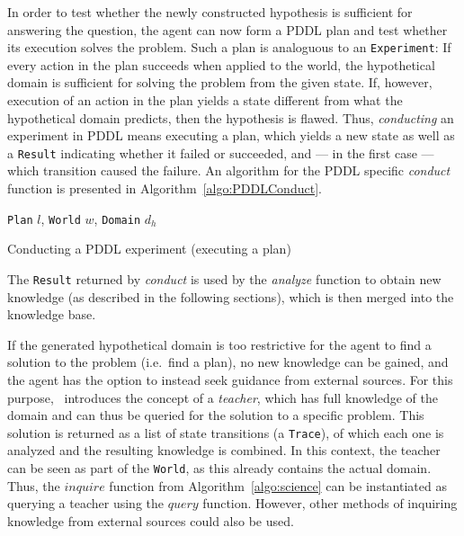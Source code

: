\documentclass[../Master.tex]{subfiles}
\begin{document}
In order to test whether the newly constructed hypothesis is sufficient for answering the question, the agent can now form a PDDL plan and test whether its execution solves the problem. Such a plan is analoguous to an \texttt{Experiment}: If every action in the plan succeeds when applied to the world, the hypothetical domain is sufficient for solving the problem from the given state. If, however, execution of an action in the plan yields a state different from what the hypothetical domain predicts, then the hypothesis is flawed. Thus, \emph{conducting} an experiment in PDDL means executing a plan, which yields a new state as well as a \texttt{Result} indicating whether it failed or succeeded, and --- in the first case --- which transition caused the failure. An algorithm for the PDDL specific \textit{conduct} function is presented in Algorithm~\ref{algo:PDDLConduct}. 

\begin{algorithm}
    \begin{algorithmic}
         {\texttt{Plan} $l$, \texttt{World} $w$, \texttt{Domain} $d_h$}
            \EndIf%
        \EndFor%
        \EndFunction%
    \end{algorithmic}
    \caption{Conducting a PDDL experiment (executing a plan)}\label{algo:PDDLConduct}
\end{algorithm}

The \texttt{Result} returned by \textit{conduct} is used by the \textit{analyze} function to obtain new knowledge (as described in the following sections), which is then merged into the knowledge base.

If the generated hypothetical domain is too restrictive for the agent to find a solution to the problem (i.e.\ find a plan), no new knowledge can be gained, and the agent has the option to instead seek guidance from external sources. For this purpose,~\cite{Walsh2008} introduces the concept of a \textit{teacher}, which has full knowledge of the domain and can thus be queried for the solution to a specific problem. This solution is returned as a list of state transitions (a \texttt{Trace}), of which each one is analyzed and the resulting knowledge is combined. In this context, the teacher can be seen as part of the \texttt{World}, as this already contains the actual domain. Thus, the $inquire$ function from Algorithm~\ref{algo:science} can be instantiated as querying a teacher using the $query$ function. However, other methods of inquiring knowledge from external sources could also be used.
\end{document}

